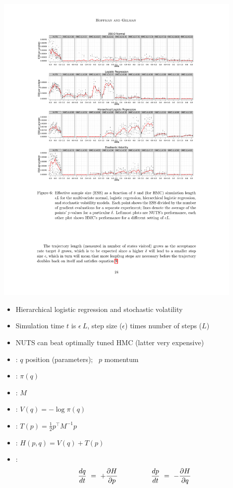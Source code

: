 \documentclass[10pt]{report}
\begin{document}
\includegraphics[width=0.9\textwidth]{img/nuts-ess-2.pdf}

{\small
  \begin{itemize}
  \item Hierarchical logistic regression and stochastic volatility
  \item Simulation time $t$ is $\epsilon \ L$, step size ($\epsilon$)
    times number of steps ($L$)
  \item NUTS can beat optimally tuned HMC (latter very expensive)
  \end{itemize}
}




\begin{itemize}
\item {}: $q$ position (parameters); \ $p$ momentum
\item {}: $\pi(q)$
\item {}: $M$
\item {}: $V(q) = -\log \pi(q)$
\item {}: $T(p) = \frac{1}{2} p^{\top} M^{-1} p$
\item {}:  $H(p,q) = V(q) + T(p)$
\item {}:
  \[
  \frac{dq}{dt} \ = \  + \frac{\partial H}{\partial p}
  \hspace*{48pt}
  \frac{dp}{dt} \ = \ - \frac{\partial H}{\partial q}
  \]
\end{itemize}
\end{document}
